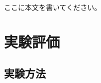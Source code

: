 \documentclass[no-page-number]{nanzan-abstract}
\begin{document}
%
%
%
%
%
%
%
%
%
%
%
%
%

ここに本文を書いてください。


\section{実験評価}

%
%
%
%


\subsection{実験方法}

%
%
%
%
%
%
%
%
%
\end{document}
